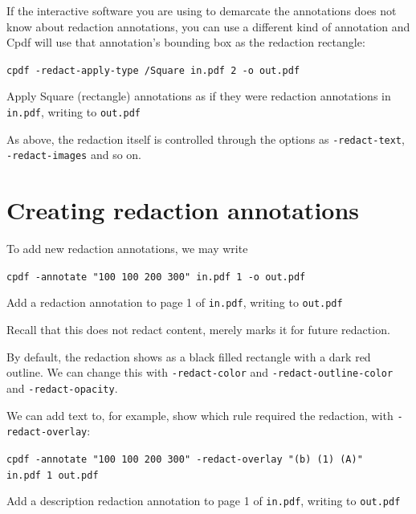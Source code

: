 \documentclass{book}
\begin{document}
If the interactive software you are using to demarcate the annotations does not know about redaction annotations, you can use a different kind of annotation and Cpdf will use that annotation's bounding box as the redaction rectangle:

  \begin{framed}
    \noindent\small\verb!cpdf -redact-apply-type /Square in.pdf 2 -o out.pdf!
 
    \vspace{2.5mm}
    \noindent Apply Square (rectangle) annotations as if they were redaction annotations in \texttt{in.pdf}, writing to \texttt{out.pdf}
  \end{framed}

As above, the redaction itself is controlled through the options as \texttt{-redact-text}, \texttt{-redact-images} and so on.

\section{Creating redaction annotations}

\noindent To add new redaction annotations, we may write

  \begin{framed}
    \noindent\small\verb!cpdf -annotate "100 100 200 300" in.pdf 1 -o out.pdf!
 
    \vspace{2.5mm}
    \noindent Add a redaction annotation to page 1 of \texttt{in.pdf}, writing to \texttt{out.pdf}
  \end{framed}

\noindent Recall that this does not redact content, merely marks it for future redaction.

By default, the redaction shows as a black filled rectangle with a dark red outline. We can change this with \texttt{-redact-color} and \texttt{-redact-outline-color} and \texttt{-redact-opacity}.

We can add text to, for example, show which rule required the redaction, with \texttt{-redact-overlay}:

  \begin{framed}
    \noindent\small\verb!cpdf -annotate "100 100 200 300" -redact-overlay "(b) (1) (A)"!
    \noindent\small\verb!     in.pdf 1 out.pdf!
 
    \vspace{2.5mm}
    \noindent Add a description redaction annotation to page 1 of \texttt{in.pdf}, writing to \texttt{out.pdf}
  \end{framed}
\end{document}
